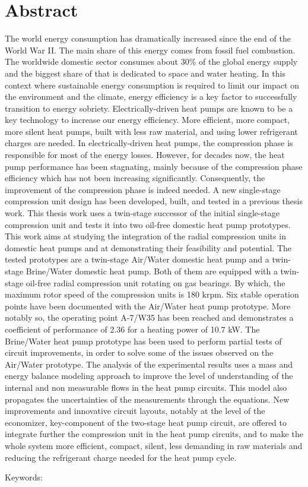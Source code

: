 \chapter{Abstract}
\label{chap:abstract}

The world energy consumption has dramatically increased since the end
of the World War II. The main share of this energy comes from fossil
fuel combustion. The worldwide domestic sector consumes about 30\% of
the global energy supply and the biggest share of that is dedicated to
space and water heating. In this context where sustainable energy
consumption is required to limit our impact on the environment and the
climate, energy efficiency is a key factor to successfully transition
to energy sobriety. Electrically-driven heat pumps are known to be a
key technology to increase our energy efficiency. More efficient, more
compact, more silent heat pumps, built with less raw material, and
using lower refrigerant charges are needed. In electrically-driven
heat pumps, the compression phase is responsible for most of the
energy losses. However, for decades now, the heat pump performance has
been stagnating, mainly because of the compression phase efficiency
which has not been increasing significantly. Consequently, the
improvement of the compression phase is indeed needed. A new
single-stage compression unit design has been developed, built, and
tested in a previous thesis work. This thesis work uses a twin-stage
successor of the initial single-stage compression unit and tests it
into two oil-free domestic heat pump prototypes. This work aims at
studying the integration of the radial compression units in domestic
heat pumps and at demonstrating their feasibility and potential. The
tested prototypes are a twin-stage Air/Water domestic heat pump and a
twin-stage Brine/Water domestic heat pump. Both of them are equipped
with a twin-stage oil-free radial compression unit rotating on gas
bearings. By which, the maximum rotor speed of the compression units
is 180 krpm. Six stable operation points have been documented with the
Air/Water heat pump prototype. More notably so, the operating point
A-7/W35 has been reached and demonstrates a coefficient of performance
of 2.36 for a heating power of 10.7 kW. The Brine/Water heat pump
prototype has been used to perform partial tests of circuit
improvements, in order to solve some of the issues observed on the
Air/Water prototype. The analysis of the experimental results uses a
mass and energy balance modeling approach to improve the level of
understanding of the internal and non measurable flows in the heat
pump circuits. This model also propagates the uncertainties of the
measurements through the equations. New improvements and innovative
circuit layouts, notably at the level of the economizer, key-component
of the two-stage heat pump circuit, are offered to integrate further
the compression unit in the heat pump circuits, and to make the whole
system more efficient, compact, silent, less demanding in raw
materials and reducing the refrigerant charge needed for the heat pump
cycle.

\vspace{10mm}

Keywords:~\varuskeywords
